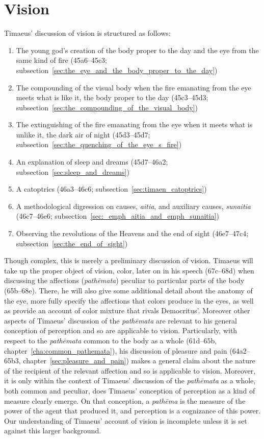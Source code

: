 
\section{Vision} %
\label{sec:vision}
Timaeus' discussion of vision is structured as follows:
\begin{enumerate}[(1)]
	\item The young god's creation of the body proper to the day and the eye from the same kind of fire (45a6--45c3; subsection~\ref{sec:the_eye_and_the_body_proper_to_the_day})
	\item The compounding of the visual body when the fire emanating from the eye meets what is like it, the body proper to the day (45c3--45d3; subsection~\ref{sec:the_compounding_of_the_visual_body})
	\item The extinguishing of the fire emanating from the eye when it meets what is unlike it, the dark air of night (45d3--45d7; subsection~\ref{sec:the_quenching_of_the_eye_s_fire})
	\item An explanation of sleep and dreams (45d7--46a2; subsection~\ref{sec:sleep_and_dreams})
	\item A catoptrics (46a3--46c6; subsection~\ref{sec:timaen_catoptrics})
	\item A methodological digression on causes, \emph{aitia}, and auxiliary causes, \emph{sunaitia} (46c7--46e6; subsection~\ref{sec:_emph_aitia_and_emph_sunaitia})
	\item Observing the revolutions of the Heavens and the end of sight (46e7--47c4; subsection~\ref{sec:the_end_of_sight})
\end{enumerate}
Though complex, this is merely a preliminary discussion of vision. Timaeus will take up the proper object of vision, color, later on in his speech (67c–68d) when discussing the affections (\emph{pathēmata}) peculiar to particular parts of the body (65b–68e). There, he will also give some additional detail about the anatomy of the eye, more fully specify the affections that colors produce in the eyes, as well as provide an account of color mixture that rivals Democritus'. Moreover other aspects of Timaeus' discussion of the \emph{pathēmata} are relevant to his general conception of perception and so are applicable to vision. Particularly, with respect to the \emph{pathēmata} common to the body as a whole (61d–65b, chapter~\ref{cha:common_pathemata}), his discussion of pleasure and pain (64a2–65b3, chapter~\ref{sec:pleasure_and_pain}) makes a general claim about the nature of the recipient of the relevant affection and so is applicable to vision. Moreover, it is only within the context of Timaeus' discussion of the \emph{pathēmata} as a whole, both common and peculiar, does Timaeus' conception of perception as a kind of measure clearly emerge. On that conception, a \emph{pathēma} is the measure of the power of the agent that produced it, and perception is a cognizance of this power. Our understanding of Timaeus' account of vision is incomplete unless it is set against this larger background.

